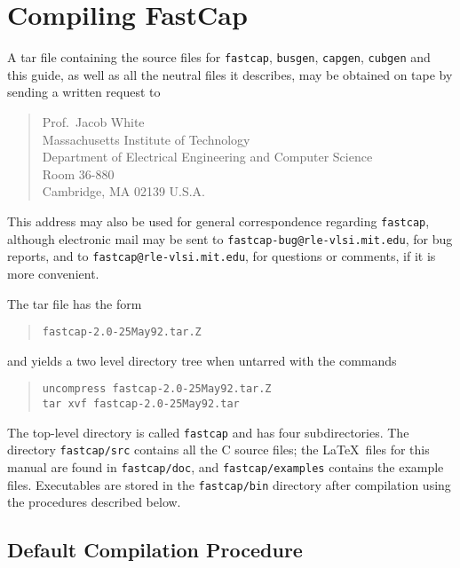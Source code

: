 %
%
\section{Compiling FastCap}
\label{comfas}


A tar file containing the source files for {\tt fastcap},
{\tt busgen}, {\tt capgen}, {\tt cubgen} and this guide, as well as
all the neutral files it describes, may be obtained on tape
by sending a written
request to
\begin{quote}
Prof.\ Jacob White\\
Massachusetts Institute of Technology\\
Department of Electrical Engineering and Computer Science\\
Room 36-880\\
Cambridge, MA 02139 U.S.A.
\end{quote}
This address may also be used for  general correspondence regarding 
{\tt fastcap}, although electronic mail may be sent to
{\tt fastcap-bug@rle-vlsi.mit.edu}, 
for bug reports, and to {\tt fastcap@rle-vlsi.mit.edu}, for
questions or comments, if it is more convenient.

The tar file has the form
\begin{quote}
\begin{verbatim}
fastcap-2.0-25May92.tar.Z
\end{verbatim}
\end{quote}
and yields a two level directory tree when untarred with the commands
\begin{quote}
\begin{verbatim}
uncompress fastcap-2.0-25May92.tar.Z
tar xvf fastcap-2.0-25May92.tar
\end{verbatim}
\end{quote}
The top-level directory is called {\tt fastcap} and has four subdirectories.
The directory {\tt fastcap/src} contains all the C source files; 
the \LaTeX\ 
files for this manual are found in {\tt fastcap/doc},  
and {\tt fastcap/examples} contains
the example files. Executables are stored in the {\tt fastcap/bin}
directory after compilation using the procedures described below.

\subsection{Default Compilation Procedure}

